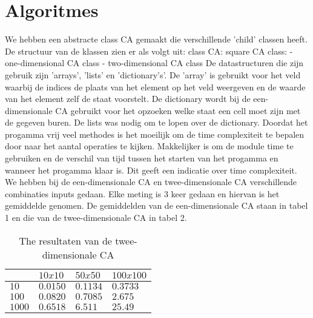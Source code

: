 \documentclass[12pt,a4paper]{article}
\begin{document}
\section*{Algoritmes}
We hebben een abstracte class CA gemaakt die verschillende 'child' classen heeft.
\newline
De structuur van de klassen zien er als volgt uit:
\newline
\phantom{.}class CA:
\newline
\phantom{.}\hspace{12pt}square CA class:
\newline
\phantom{.}\hspace{24pt}- one-dimensional CA class
\newline
\phantom{.}\hspace{24pt}- two-dimensional CA class
\vspace{6pt}
\newline
De datastructuren die zijn gebruik zijn 'arrays', 'lists' en 'dictionary's'. 
De 'array' is gebruikt voor het veld waarbij de indices de plaats van het element op het veld weergeven en 
de waarde van het element zelf de staat voorstelt.
De dictionary wordt bij de een-dimensionale CA gebruikt voor het opzoeken welke staat een cell moet zijn met de gegeven buren.
De lists was nodig om te lopen over de dictionary.
\newline
Doordat het progamma vrij veel methodes is het moeilijk om 
de time complexiteit te bepalen door naar het aantal operaties te kijken.
Makkelijker is om de module time te gebruiken en de verschil van tijd tussen het starten van het progamma en wanneer het progamma klaar is.
Dit geeft een indicatie over time complexiteit.  
We hebben bij de een-dimensionale CA en twee-dimensionale CA verschillende combinaties 
inputs gedaan. Elke meting is 3 keer gedaan en hiervan is het gemiddelde genomen.
De gemiddelden van de een-dimensionale CA staan in tabel 1 en die 
van de twee-dimensionale CA in tabel 2.

\begin{table*}
    \centering
    \begin{tabular}{|m{1.2cm}|m{2.0cm}|m{2.0cm}|m{2.0cm}|}
        \hline
        $\phantom{.}$ & $10x10$ & $50x50$ & $100x100$ \\
        \hline
        $10$ & $0.0150$ & $0.1134$ & $0.3733$ \\
        \hline
        $100$ & $0.0820$ & $0.7085$ & $2.675$ \\
        \hline
        $1000$ & $0.6518$ & $6.511$ & $25.49$ \\
        \hline
    \end{tabular}
    \caption{The resultaten van de twee-dimensionale CA}
    \label{tbl:nummers}
\end{table*}
\end{document}
